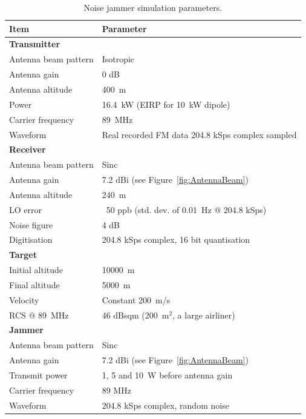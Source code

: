 \documentclass[conference]{IEEEtran}
\begin{document}
\begin{table}[ht!]\label{tab:SimulationParameters}
\caption{Noise jammer simulation parameters.}

	\centering
	


\begin{tabu} to \columnwidth{X[2,l] X[3,l]}
		\hline
  		Item 								& Parameter\\
  		\hline
  		\textbf{Transmitter} 				& \\
  		Antenna beam pattern 				& Isotropic\\
  		Antenna gain 						& 0 dB\\
  		Antenna altitude 					& 400~m\\
  		Power 								& 16.4~kW (EIRP for 10~kW dipole)\\
  		Carrier frequency					& 89~MHz\\
  		Waveform							& Real recorded FM data 204.8 kSps complex sampled\\%
  		\textbf{Receiver} 					& \\
  		Antenna beam pattern 				& Sinc\\
  		Antenna gain 						& 7.2 dBi (see Figure~\ref{fig:AntennaBeam})\\
  		Antenna altitude					& 240~m\\
  		LO error							& ~50 ppb (std. dev. of 0.01~Hz @ 204.8 kSps)\\
  		Noise figure						& 4 dB\\
  		Digitisation						& 204.8 kSps complex, 16 bit quantisation\\%
		\textbf{Target} 					& \\
		Initial altitude					& 10000~m\\
		Final altitude						& 5000~m\\
		Velocity							& Constant 200~m/s\\
		RCS @ 89~MHz						& 46 dBsqm (200~m$^2$, a large airliner)\\%
		\textbf{Jammer} 					& \\
		Antenna beam pattern				& Sinc\\
  		Antenna gain 						& 7.2 dBi (see Figure~\ref{fig:AntennaBeam})\\
  		Transmit power						& 1, 5 and 10~W before antenna gain\\
  		Carrier frequency					& 89 MHz\\
  		Waveform							& 204.8 kSps complex, random noise\\%

\end{tabu}
\end{table}
\end{document}

